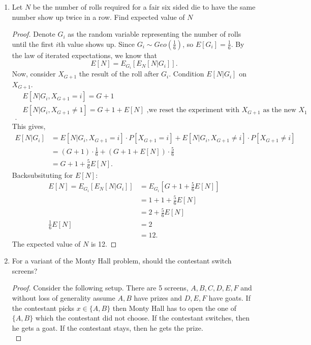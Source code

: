 \documentclass[a4paper]{article}
\begin{document}
\begin{enumerate}
\begin{proof}
    \end{proof}
  \item Let $N$ be the number of rolls required for a fair six sided die to have the same number show up twice in a row. Find expected value of $N$
    \begin{proof}
      Denote $G_i$ as the random variable  representing the number of rolls until the first $i$th value shows up. Since  $G_i \sim Geo(\frac{1}{6})$, so $E[G_i] = \frac{1}{6}$. By the law of iterated expectations, we know that 
\[
  E[N] = E_{G_i}[E_N[N|G_i]]      
.\] 
Now, consider $X_{G+1}$ the result of the roll after $G_i$. Condition $E[N|G_i]$ on  $X_{G+1}$.
\begin{align*}
  & E[N|G_i, X_{G+1} = i] = G + 1 \\
  & E[N|G_i, X_{G+1} \neq 1] = G + 1 + E[N] \text{ ,we reset the experiment with $X_{G+1}$ as the new $X_1$} \\
.\end{align*}
This gives,
\begin{align*}
  E[N|G_i] &= E[N|G_i, X_{G+1} = i] \cdot P[X_{G+1} = i] + E[N|G_i, X_{G+1} \neq i] \cdot P[X_{G+1} \neq i] \\
           &= (G+1) \cdot \frac{1}{6} + (G+1 + E[N]) \cdot \frac{5}{6} \\
           &= G+1 + \frac{5}{6}E[N]
.\end{align*}
Backsubsituting for $E[N]$:
 \begin{align*}
   E[N] = E_{G_i}[E_N[N | G_i]] &= E_{G_i}[G+1 + \frac{5}{6}E[N]] \\
                                &= 1 + 1 + \frac{5}{6} E[N] \\
                                &= 2 + \frac{5}{6}E[N] \\
   \frac{1}{6}E[N] &= 2 \\
                   &= 12
.\end{align*}
The expected value of $N$ is 12.
    \end{proof}
  \item For a variant of the Monty Hall problem, should the contestant switch screens?
    \begin{proof}
      Consider the following setup. There are 5 screens, $A,B,C,D,E,F$ and without loss of generality assume $A,B$ have prizes and  $D,E,F$ have goats. If the contestant picks  $x \in \{A,B\}$ then Monty Hall has to open the one of $\{A,B\} $ which the contestant did not choose. If the contestant switches, then he gets a goat. If the contestant stays, then he gets the prize. \\



\end{proof}
\end{enumerate}
\end{document}
